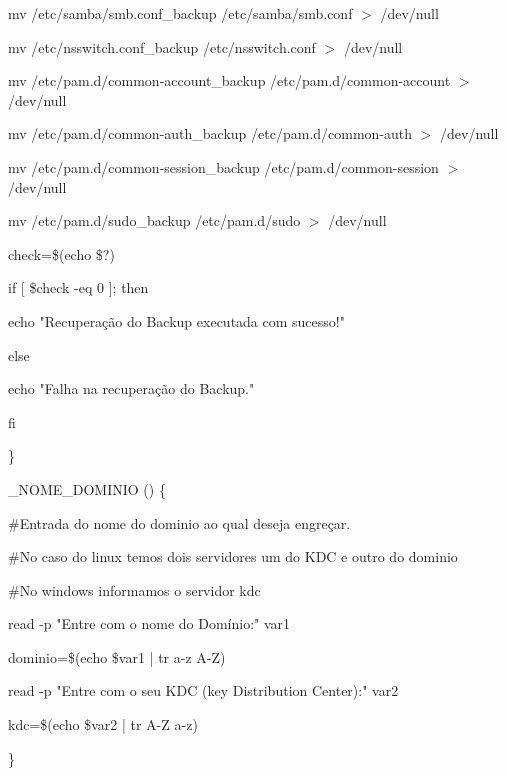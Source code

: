         mv /etc/samba/smb.conf\_backup /etc/samba/smb.conf $>$ /dev/null

        mv /etc/nsswitch.conf\_backup /etc/nsswitch.conf $>$ /dev/null

        mv /etc/pam.d/common-account\_backup /etc/pam.d/common-account $>$ /dev/null

        mv /etc/pam.d/common-auth\_backup /etc/pam.d/common-auth $>$ /dev/null
        
        mv /etc/pam.d/common-session\_backup /etc/pam.d/common-session $>$ /dev/null

        mv /etc/pam.d/sudo\_backup /etc/pam.d/sudo $>$ /dev/null
         
        
				check=\$(echo \$?)

   if [ \$check -eq 0 ]; then

      echo "Recuperação do Backup executada com sucesso!"

   else

      echo "Falha na recuperação do Backup."

   fi
         
\}

\_NOME\_DOMINIO () \{
 
   \#Entrada do nome do dominio ao qual deseja engreçar.

	 \#No caso do linux temos dois servidores um do KDC e outro do dominio

	 \#No windows informamos o servidor kdc

    read -p "Entre com o nome do Domínio:" var1

    dominio=\$(echo \$var1 | tr a-z A-Z)

    read -p "Entre com o seu KDC (key Distribution Center):" var2

    kdc=\$(echo \$var2 | tr A-Z a-z)         

\}

